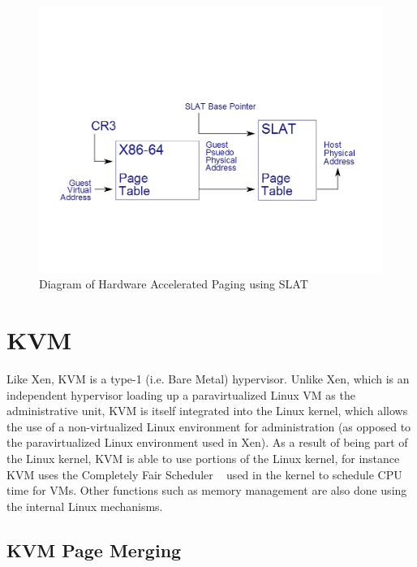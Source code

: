 \begin{figure}\label{SLAT}
	  \centering
	  \includegraphics[width=\textwidth]{figures/BM_Graph1.png}
	  \caption{Diagram of Hardware Accelerated Paging using SLAT }
\end{figure}

\section{KVM}

Like Xen, KVM is a type-1 (i.e. Bare Metal) hypervisor. Unlike Xen, which is an independent hypervisor loading up a paravirtualized Linux VM as the administrative unit, KVM is itself integrated into the Linux kernel, which allows the use of a non-virtualized Linux environment for administration (as opposed to the paravirtualized Linux environment used in Xen). As a result of being part of the Linux kernel, KVM is able to use portions of the Linux kernel, for instance KVM uses the Completely Fair Scheduler ~\cite{pabla_completely_2009} used in the kernel to schedule CPU time for VMs. Other functions such as memory management are also done using the internal Linux mechanisms.  

\subsection{KVM Page Merging}

